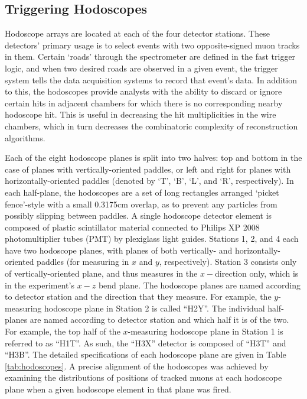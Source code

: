 \subsection{Triggering Hodoscopes}

Hodoscope arrays are located at each of the four detector stations. These detectors' primary usage is to select events with two opposite-signed muon tracks in them. Certain `roads' through the spectrometer are defined in the fast trigger logic, and when two desired roads are observed in a given event, the trigger system tells the data acquisition systems to record that event's data. In addition to this, the hodoscopes provide analysts with the ability to discard or ignore certain hits in adjacent chambers for which there is no corresponding nearby hodoscope hit. This is useful in decreasing the hit multiplicities in the wire chambers, which in turn decreases the combinatoric complexity of reconstruction algorithms.

Each of the eight hodoscope planes is split into two halves: top and bottom in the case of planes with vertically-oriented paddles, or left and right for planes with horizontally-oriented paddles (denoted by `T', `B', `L', and `R', respectively). In each half-plane, the hodoscopes are a set of long rectangles arranged `picket fence'-style with a small 0.3175cm overlap, as to prevent any particles from possibly slipping between paddles. A single hodoscope detector element is composed of plastic scintillator material connected to Philips XP 2008 photomultiplier tubes (PMT) by plexiglass light guides. Stations 1, 2, and 4 each have two hodoscope planes, with planes of both vertically- and horizontally-oriented paddles (for measuring in $x$ and $y$, respectively). Station 3 consists only of vertically-oriented plane, and thus measures in the $x-$direction only, which is in the experiment's $x-z$ bend plane. The hodoscope planes are named according to detector station and the direction that they measure. For example, the $y$-measuring hodoscope plane in Station 2 is called ``H2Y''. The individual half-planes are named according to detector station and which half it is of the two. For example, the top half of the $x$-measuring hodoscope plane in Station 1 is referred to as ``H1T''. As such, the ``H3X'' detector is composed of ``H3T'' and ``H3B''. The detailed specifications of each hodoscope plane are given in Table \ref{tab:hodoscopes}. A precise alignment of the hodoscopes was achieved by examining the distributions of positions of tracked muons at each hodoscope plane when a given hodoscope element in that plane was fired.

